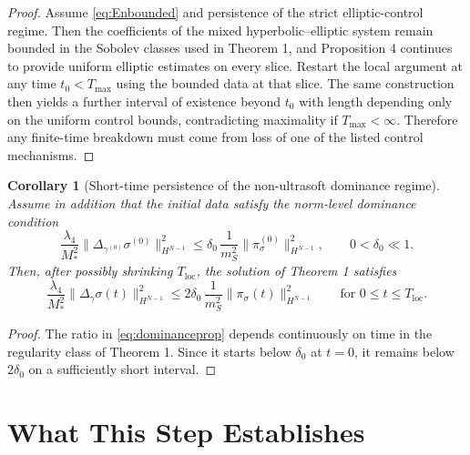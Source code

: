 \documentclass[11pt]{article}
\newtheorem{corollary}{Corollary}
\begin{document}
\begin{proof}
Assume \eqref{eq:Enbounded} and persistence of the strict elliptic-control regime. Then the coefficients of the mixed hyperbolic--elliptic system remain bounded in the Sobolev classes used in Theorem 1, and Proposition 4 continues to provide uniform elliptic estimates on every slice. Restart the local argument at any time \(t_0<T_{\max}\) using the bounded data at that slice. The same construction then yields a further interval of existence beyond \(t_0\) with length depending only on the uniform control bounds, contradicting maximality if \(T_{\max}<\infty\). Therefore any finite-time breakdown must come from loss of one of the listed control mechanisms.
\end{proof}

\begin{corollary}[Short-time persistence of the non-ultrasoft dominance regime]
Assume in addition that the initial data satisfy the norm-level dominance condition
\begin{equation}
\frac{\lambda_4}{M_*^2}\|\Delta_{\gamma^{(0)}}\sigma^{(0)}\|_{H^{N-1}}^2
\le
\delta_0\,
\frac{1}{m_S^2}\|\pi_\sigma^{(0)}\|_{H^{N-1}}^2,
\qquad
0<\delta_0\ll 1.
\label{eq:dominance0}
\end{equation}
Then, after possibly shrinking \(T_{\mathrm{loc}}\), the solution of Theorem 1 satisfies
\begin{equation}
\frac{\lambda_4}{M_*^2}\|\Delta_\gamma\sigma(t)\|_{H^{N-1}}^2
\le
2\delta_0\,
\frac{1}{m_S^2}\|\pi_\sigma(t)\|_{H^{N-1}}^2
\qquad
\text{for } 0\le t\le T_{\mathrm{loc}}.
\label{eq:dominanceprop}
\end{equation}
\end{corollary}

\begin{proof}
The ratio in \eqref{eq:dominanceprop} depends continuously on time in the regularity class of Theorem 1. Since it starts below \(\delta_0\) at \(t=0\), it remains below \(2\delta_0\) on a sufficiently short interval.
\end{proof}

\section{What This Step Establishes}
\end{document}
